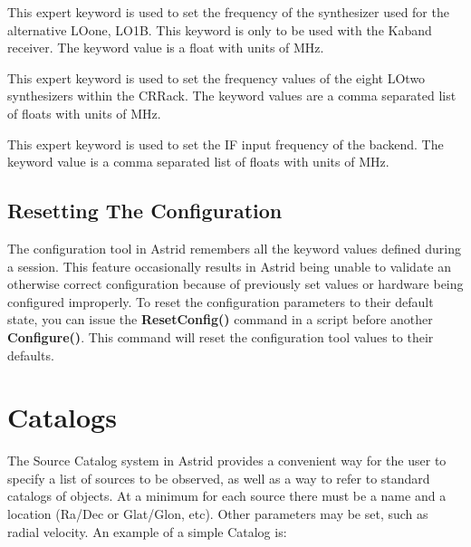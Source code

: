 \begin{description}[font=\bfseries\large,leftmargin=*]
\item[lo1bfreq] This expert keyword is used to set the frequency of
the synthesizer used for the alternative \gls{LOone}, LO1B.  This keyword is
only to be used with the \gls{Kaband} receiver.  The keyword value is a float
with units of MHz.

\item[lo2freq] This expert keyword is used to set the frequency
values of the eight \gls{LOtwo} synthesizers within the \gls{CRRack}.  
The keyword values are a comma separated list of floats with units 
of MHz.

\item[if3freq] This expert keyword is used to set the \gls{IF} input
frequency of the backend.  The keyword value is a comma separated list of
floats with units of MHz.

\end{description}

\subsection{Resetting The Configuration}\label{sec:reset}

The configuration tool in \gls{Astrid} remembers all the keyword values
defined during a session. This feature occasionally results in \gls{Astrid}
being unable to validate an otherwise correct configuration because of
previously set values or hardware being configured improperly.
To reset the configuration parameters to their default state, you can
issue the  {\bfseries{\textcolor{pythonKeywords}{ResetConfig}}()} command
in a script before another
{\bfseries{\textcolor{pythonKeywords}{Configure}}()}. This command will
reset the configuration tool values to their defaults.

\newpage


\section{Catalogs}\label{sec:catalogs}

The Source Catalog system in \gls{Astrid} provides a convenient way for the user 
to specify a list of sources to be observed, as well as a way to refer to 
standard catalogs of objects.  At a minimum for each source there must be a 
name and a location (Ra/Dec or Glat/Glon, etc). Other parameters may be 
set, such as radial velocity.
An example of a simple Catalog is:

